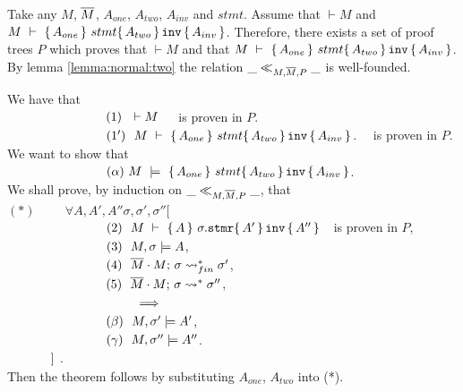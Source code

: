 Take any $M$, $\overline{M}$, $A_{one}$, $A_{two}$, $A_{inv}$ and $stmt$. Assume that $\vdash M$  and 
$M\ \vdash\   \{\, A_{one} \, \}\ stmt \{\, A_{two} \, \} \, {\texttt{inv}}\, \{\, A_{inv} \, \} $.
Therefore, there exists a set of
proof trees $P$ which proves that $\vdash M$ and that $M\ \vdash\   \{\, A_{one} \, \}\ stmt \{\, A_{two} \, \} \, {\texttt{inv}}\, \{\, A_{inv} \, \} $.
By lemma \ref{lemma:normal:two} the relation $\_ \ll_{M,\overline{M},P}  \_$ is well-founded.
 
 We have that \\
 $\strut \ \ \hspace{2.3cm} \ \ (1) \ \ \vdash M $\ \ \  is proven in $P$.\\
$\strut \ \ \hspace{2.3cm} \ \ (1') \ \ M\ \vdash\  \quadruple {A_{one}}  {stmt}{A_{two}} {A_{inv}}$. \ \  is proven in $P$.
\\
We want to show  that\\
 $\strut \ \ \hspace{2.3cm} \ \ (\alpha) \  M\ \models\  \quadruple {A_{one}}  {stmt}{A_{two}} {A_{inv}}$. 
 \\ 
We shall prove,  by induction on $\_ \ll_{M,\overline{M},P}  \_$, that 
\\ 
$(*) \hspace{1cm} \forall A, A', A'' \sigma, \sigma',\sigma''[$\\
$\strut \ \ \hspace{2.3cm} \ \ (2) \ \ M\ \vdash\  \quadruple {A}  {\sigma.\prg{stmr}} {A'} {A''} \ \ $ is proven in $P$,\\
$\strut \ \ \hspace{2.3cm} \ \ (3) \ \ M, \sigma \models A$, \\
$\strut \ \ \hspace{2.3cm} \ \ (4) \ \ \leadstoBoundedStarFin {\Mtwo\cdot M}  {\sigma}  {\sigma'}$,\\
$\strut \ \ \hspace{2.3cm} \ \ (5) \ \ \leadstoBoundedStar  {\Mtwo\cdot M}  {\sigma}  {\sigma''}$,\\
$\strut \ \ \hspace{2.3cm} \ \ \ \ \ \ \ \ \ \Longrightarrow$\\
$\strut  \ \ \hspace{2.3cm} \ \ (\beta)\ \  M, \sigma' \models A'$,\\
$\strut  \ \ \hspace{2.3cm} \ \ (\gamma)\ \  M, \sigma'' \models A''$.\\
$\strut \ \   \hspace{1cm} ]$
.
\\
Then the  theorem follows by substituting $A_{one}$, $A_{two}$ into (*).

